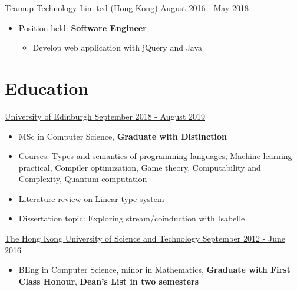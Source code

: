 \documentclass[a4paper,12pt]{article}
\begin{document}
  \uline{Teamup Technology Limited (Hong Kong) \hfill August 2016 - May 2018}
    \begin{itemize}
      \item Position held: \textbf{Software Engineer}
      \begin{itemize}
        \item Develop web application with jQuery and Java
      \end{itemize}
    \end{itemize}

  \section*{Education}
  \uline{University of Edinburgh \hfill September 2018 - August 2019}
  \begin{itemize}
    \item MSc in Computer Science, \textbf{Graduate with Distinction}
    \item Courses: Types and semantics of programming languages, Machine learning practical, Compiler optimization, Game theory, Computability and Complexity, Quantum computation
    \item Literature review on Linear type system
    \item Dissertation topic: Exploring stream/coinduction with Isabelle
    
  \end{itemize}
  \uline{The Hong Kong University of Science and Technology \hfill September 2012 - June 2016}
  \begin{itemize}
    \item BEng in Computer Science, minor in Mathematics, \textbf{Graduate with First Class Honour}, \textbf{Dean's List in two semesters}
  \end{itemize}
\end{document}
